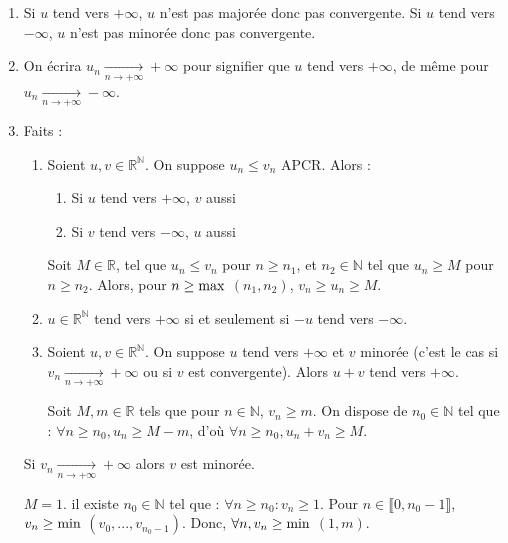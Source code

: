 \documentclass[12pt,a4paper]{report}
\begin{document}
\begin{remarque}
\begin{enumerate}
\item Si $u$ tend vers $+\infty$, $u$ n'est pas majorée donc pas convergente. Si $u$ tend vers $-\infty$, $u$ n'est pas minorée donc pas convergente.
\item On écrira $u_n \xrightarrow[n \rightarrow +\infty]{} +\infty$ pour signifier que $u$ tend vers $+\infty$, de même pour $u_n \xrightarrow[n \rightarrow +\infty]{} -\infty$.
\item Faits : 
\begin{enumerate}
\item Soient $u,v \in \mathbb{R}^\mathbb{N}$. On suppose $u_n \leq v_n$ APCR. Alors : 
\begin{enumerate}
\item Si $u$ tend vers $+\infty$, $v$ aussi
\item Si $v$ tend vers $-\infty$, $u$ aussi
\end{enumerate}
\begin{demo}
Soit $M \in \mathbb{R}$, tel que $u_n \leq v_n$ pour $n \geq n_1$, et $n_2 \in \mathbb{N}$ tel que $u_n \geq M$ pour $n \geq n_2$. \newline Alors, pour $n \geq \rm{max}$ $(n_1,n_2)$, $v_n \geq u_n \geq M$.
\end{demo}

\item $u \in \mathbb{R}^\mathbb{N}$ tend vers $+\infty$ si et seulement si $-u$ tend vers $-\infty$.
\item Soient $u,v \in \mathbb{R}^\mathbb{N}$. On suppose $u$ tend vers $+\infty$ et $v$ minorée (c'est le cas si $v_n \xrightarrow[n \rightarrow +\infty]{} +\infty$ ou si $v$ est convergente). Alors $u+v$ tend vers $+\infty$.

\begin{demo}
Soit $M,m \in \mathbb{R}$ tels que pour $n \in \mathbb{N}$, $v_n \geq m$. On dispose de $n_0 \in \mathbb{N}$ tel que : $\forall n \geq n_0, u_n \geq M-m$, d'où $\forall n \geq n_0, u_n+v_n \geq M$.
\end{demo}

\end{enumerate}
\begin{remarque}
Si $v_n \xrightarrow[n \rightarrow +\infty]{} +\infty$ alors $v$ est minorée.
\end{remarque}

\begin{demo}
$M = 1$. il existe $n_0 \in \mathbb{N}$ tel que : $\forall n \geq n_0 : v_n \geq 1$.
\newline Pour $n \in \llbracket 0,n_0-1 \rrbracket$, $v_n \geq \rm{min}$ $(v_0,...,v_{n_0-1})$.
\newline Donc, $\forall n, v_n \geq \rm{min}$ $(1,m)$.
\end{demo}


\end{enumerate}
\end{remarque}
\end{document}
